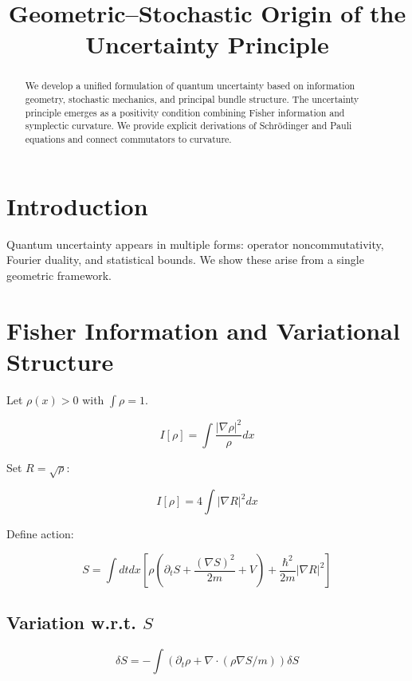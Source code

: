 \documentclass[11pt]{article}
\title{Geometric--Stochastic Origin of the Uncertainty Principle}
\author{}
\date{}
\begin{document}
\maketitle

\begin{abstract}
We develop a unified formulation of quantum uncertainty based on information geometry, stochastic mechanics, and principal bundle structure. The uncertainty principle emerges as a positivity condition combining Fisher information and symplectic curvature. We provide explicit derivations of Schr\"odinger and Pauli equations and connect commutators to curvature.
\end{abstract}

\section{Introduction}
Quantum uncertainty appears in multiple forms: operator noncommutativity, Fourier duality, and statistical bounds. We show these arise from a single geometric framework.

\section{Fisher Information and Variational Structure}

Let $\rho(x)>0$ with $\int \rho=1$.

\begin{equation}
I[\rho] = \int \frac{|\nabla \rho|^2}{\rho} dx
\end{equation}

Set $R=\sqrt{\rho}$:

\begin{equation}
I[\rho]=4\int |\nabla R|^2 dx
\end{equation}

Define action:

\begin{equation}
S = \int dt dx \left[ \rho\left(\partial_t S + \frac{(\nabla S)^2}{2m} + V\right) + \frac{\hbar^2}{2m}|\nabla R|^2 \right]
\end{equation}

\subsection{Variation w.r.t. $S$}

\begin{equation}
\delta S = -\int (\partial_t \rho + \nabla\cdot(\rho \nabla S/m)) \delta S
\end{equation}
\end{document}
